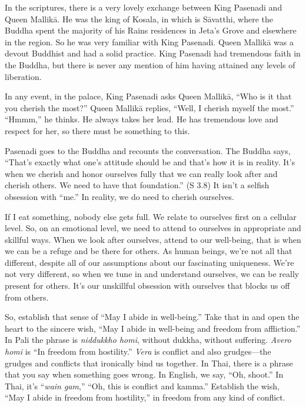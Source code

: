 In the scriptures, there is a very lovely exchange between King Pasenadi
and Queen Mallikā. He was the king of Kosala, in which is Sāvatthi,
where the Buddha spent the majority of his Rains residences in Jeta's
Grove and elsewhere in the region. So he was very familiar with King
Pasenadi. Queen Mallikā was a devout Buddhist and had a solid practice.
King Pasenadi had tremendous faith in the Buddha, but there is never any
mention of him having attained any levels of liberation.

In any event, in the palace, King Pasenadi asks Queen Mallikā, “Who is
it that you cherish the most?” Queen Mallikā replies, “Well, I cherish
myself the most.” “Hmmm,” he thinks. He always takes her lead. He has
tremendous love and respect for her, so there must be something to this.

Pasenadi goes to the Buddha and recounts the conversation. The Buddha
says, “That’s exactly what one’s attitude should be and that’s how it is
in reality. It’s when we cherish and honor ourselves fully that we can
really look after and cherish others. We need to have that foundation.”
(S 3.8) It isn’t a selfish obsession with “me.” In reality, we do need
to cherish ourselves.

If I eat something, nobody else gets full. We relate to ourselves first
on a cellular level. So, on an emotional level, we need to attend to
ourselves in appropriate and skillful ways. When we look after
ourselves, attend to our well-being, that is when we can be a refuge and
be there for others. As human beings, we’re not all that different,
despite all of our assumptions about our fascinating uniqueness. We’re
not very different, so when we tune in and understand ourselves, we can
be really present for others. It’s our unskillful obsession with
ourselves that blocks us off from others.

So, establish that sense of “May I abide in well-being.” Take that in
and open the heart to the sincere wish, “May I abide in well-being and
freedom from affliction.” In Pali the phrase is \emph{niddukkho homi},
without dukkha, without suffering. \emph{Avero homi} is “In freedom from
hostility.” \emph{Vera} is conflict and also grudges—the grudges and
conflicts that ironically bind us together. In Thai, there is a phrase
that you say when something goes wrong. In English, we say, “Oh, shoot.”
In Thai, it’s “\emph{wain gam},” “Oh, this is conflict and kamma.”
Establish the wish, “May I abide in freedom from hostility,” in freedom
from any kind of conflict.

